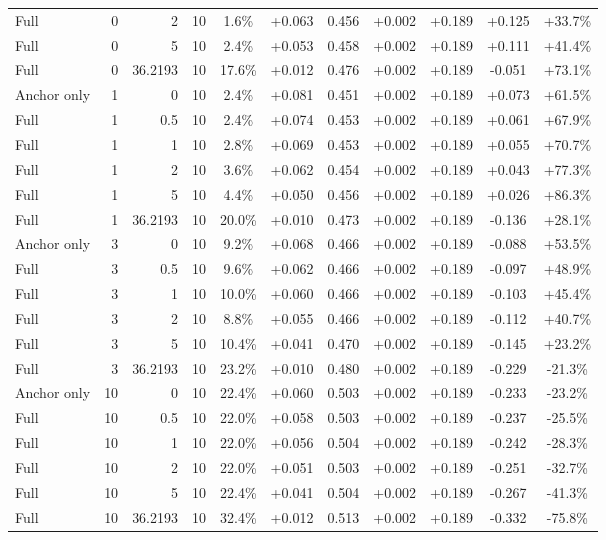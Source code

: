 \begin{table}[htbp]
\begin{tabular}{lrrrccccccc}
Full & 0 & 2 & 10 & 1.6\% & +0.063 & 0.456 & +0.002 & +0.189 & +0.125 & +33.7\% \\
Full & 0 & 5 & 10 & 2.4\% & +0.053 & 0.458 & +0.002 & +0.189 & +0.111 & +41.4\% \\
Full & 0 & 36.2193 & 10 & 17.6\% & +0.012 & 0.476 & +0.002 & +0.189 & -0.051 & +73.1\% \\
Anchor only & 1 & 0 & 10 & 2.4\% & +0.081 & 0.451 & +0.002 & +0.189 & +0.073 & +61.5\% \\
Full & 1 & 0.5 & 10 & 2.4\% & +0.074 & 0.453 & +0.002 & +0.189 & +0.061 & +67.9\% \\
Full & 1 & 1 & 10 & 2.8\% & +0.069 & 0.453 & +0.002 & +0.189 & +0.055 & +70.7\% \\
Full & 1 & 2 & 10 & 3.6\% & +0.062 & 0.454 & +0.002 & +0.189 & +0.043 & +77.3\% \\
Full & 1 & 5 & 10 & 4.4\% & +0.050 & 0.456 & +0.002 & +0.189 & +0.026 & +86.3\% \\
Full & 1 & 36.2193 & 10 & 20.0\% & +0.010 & 0.473 & +0.002 & +0.189 & -0.136 & +28.1\% \\
Anchor only & 3 & 0 & 10 & 9.2\% & +0.068 & 0.466 & +0.002 & +0.189 & -0.088 & +53.5\% \\
Full & 3 & 0.5 & 10 & 9.6\% & +0.062 & 0.466 & +0.002 & +0.189 & -0.097 & +48.9\% \\
Full & 3 & 1 & 10 & 10.0\% & +0.060 & 0.466 & +0.002 & +0.189 & -0.103 & +45.4\% \\
Full & 3 & 2 & 10 & 8.8\% & +0.055 & 0.466 & +0.002 & +0.189 & -0.112 & +40.7\% \\
Full & 3 & 5 & 10 & 10.4\% & +0.041 & 0.470 & +0.002 & +0.189 & -0.145 & +23.2\% \\
Full & 3 & 36.2193 & 10 & 23.2\% & +0.010 & 0.480 & +0.002 & +0.189 & -0.229 & -21.3\% \\
Anchor only & 10 & 0 & 10 & 22.4\% & +0.060 & 0.503 & +0.002 & +0.189 & -0.233 & -23.2\% \\
Full & 10 & 0.5 & 10 & 22.0\% & +0.058 & 0.503 & +0.002 & +0.189 & -0.237 & -25.5\% \\
Full & 10 & 1 & 10 & 22.0\% & +0.056 & 0.504 & +0.002 & +0.189 & -0.242 & -28.3\% \\
Full & 10 & 2 & 10 & 22.0\% & +0.051 & 0.503 & +0.002 & +0.189 & -0.251 & -32.7\% \\
Full & 10 & 5 & 10 & 22.4\% & +0.041 & 0.504 & +0.002 & +0.189 & -0.267 & -41.3\% \\
Full & 10 & 36.2193 & 10 & 32.4\% & +0.012 & 0.513 & +0.002 & +0.189 & -0.332 & -75.8\% \\

\end{tabular}
\end{table}
